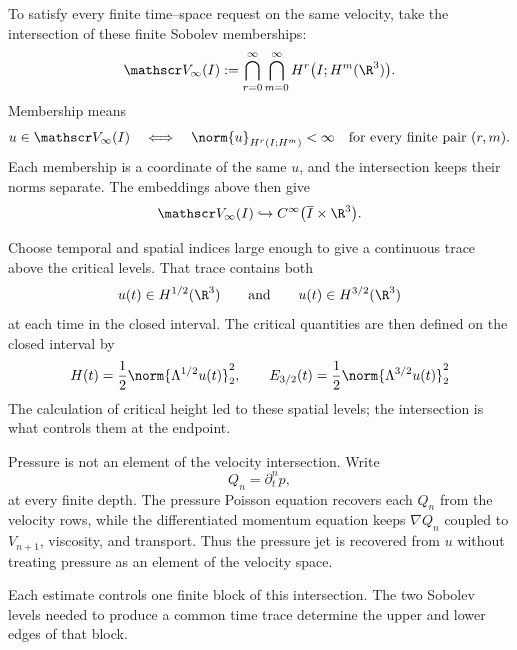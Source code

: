 To satisfy every finite time--space request on the same velocity, take the intersection of these finite Sobolev memberships:
\[
  \mathscr V_\infty(I)
  :=
  \bigcap_{r=0}^{\infty}
  \bigcap_{m=0}^{\infty}
  H^r\bigl(I;H^m(\R^3)\bigr).
\]
Membership means
\[
  u\in\mathscr V_\infty(I)
  \quad\Longleftrightarrow\quad
  \norm{u}_{H^r(I;H^m)}
  <
  \infty
  \quad
  \text{for every finite pair }(r,m).
\]
Each membership is a coordinate of the same \(u\), and the intersection keeps their norms separate.
The embeddings above then give
\[
  \mathscr V_\infty(I)
  \hookrightarrow
  C^\infty\bigl(\overline I\times\R^3\bigr).
\]

Choose temporal and spatial indices large enough to give a continuous trace above the critical levels.
That trace contains both
\[
  u(t)\in H^{1/2}(\R^3)
  \qquad\text{and}\qquad
  u(t)\in H^{3/2}(\R^3)
\]
at each time in the closed interval.
The critical quantities are then defined on the closed interval by
\[
  H(t)=\frac12\norm{\Lambda^{1/2}u(t)}_2^2,
  \qquad
  E_{3/2}(t)=\frac12\norm{\Lambda^{3/2}u(t)}_2^2
\]
The calculation of critical height led to these spatial levels; the intersection is what controls them at the endpoint.

Pressure is not an element of the velocity intersection.
Write
\[
  Q_n=\partial_t^np,
\]
at every finite depth.
The pressure Poisson equation recovers each \(Q_n\) from the velocity rows, while the differentiated momentum equation keeps \(\nabla Q_n\) coupled to \(V_{n+1}\), viscosity, and transport.
Thus the pressure jet is recovered from \(u\) without treating pressure as an element of the velocity space.

Each estimate controls one finite block of this intersection.
The two Sobolev levels needed to produce a common time trace determine the upper and lower edges of that block.
